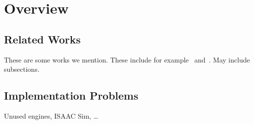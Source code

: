 \chapter{Overview}\label{ch:overview}


\section{Related Works}\label{sec:related-works}
These are some works we mention.
These include for example~\cite{kibbaka} and~\cite{article}.
May include subsections.

\section{Implementation Problems}\label{sec:implementation-problems}
Unused engines, ISAAC Sim, \ldots
